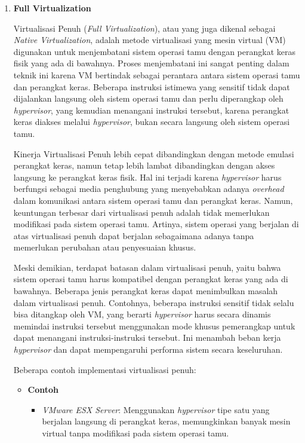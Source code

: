 \documentclass[12pt]{article}
\begin{document}
\begin{enumerate}
    \item \textbf{Full Virtualization}
    \par Virtualisasi Penuh (\textit{Full Virtualization}), atau yang juga dikenal sebagai \textit{Native Virtualization}, adalah metode virtualisasi yang mesin virtual (VM) digunakan untuk menjembatani sistem operasi tamu dengan perangkat keras fisik yang ada di bawahnya. Proses menjembatani ini sangat penting dalam teknik ini karena VM bertindak sebagai perantara antara sistem operasi tamu dan perangkat keras. Beberapa instruksi istimewa yang sensitif tidak dapat dijalankan langsung oleh sistem operasi tamu dan perlu diperangkap oleh \textit{hypervisor}, yang kemudian menangani instruksi tersebut, karena perangkat keras diakses melalui \textit{hypervisor}, bukan secara langsung oleh sistem operasi tamu.
    
    \par Kinerja Virtualisasi Penuh lebih cepat dibandingkan dengan metode emulasi perangkat keras, namun tetap lebih lambat dibandingkan dengan akses langsung ke perangkat keras fisik. Hal ini terjadi karena \textit{hypervisor} harus berfungsi sebagai media penghubung yang menyebabkan adanya \textit{overhead} dalam komunikasi antara sistem operasi tamu dan perangkat keras. Namun, keuntungan terbesar dari virtualisasi penuh adalah tidak memerlukan modifikasi pada sistem operasi tamu. Artinya, sistem operasi yang berjalan di atas virtualisasi penuh dapat berjalan sebagaimana adanya tanpa memerlukan perubahan atau penyesuaian khusus.
    
    \par Meski demikian, terdapat batasan dalam virtualisasi penuh, yaitu bahwa sistem operasi tamu harus kompatibel dengan perangkat keras yang ada di bawahnya. Beberapa jenis perangkat keras dapat menimbulkan masalah dalam virtualisasi penuh. Contohnya, beberapa instruksi sensitif tidak selalu bisa ditangkap oleh VM, yang berarti \textit{hypervisor} harus secara dinamis memindai instruksi tersebut menggunakan mode khusus pemerangkap untuk dapat menangani instruksi-instruksi tersebut. Ini menambah beban kerja \textit{hypervisor} dan dapat mempengaruhi performa sistem secara keseluruhan.
    
    \par Beberapa contoh implementasi virtualisasi penuh:
    \begin{itemize}
        \item \textbf{Contoh}
        \begin{itemize}
            \item \textit{VMware ESX Server}: Menggunakan \textit{hypervisor} tipe satu yang berjalan langsung di perangkat keras, memungkinkan banyak mesin virtual tanpa modifikasi pada sistem operasi tamu.
    

\end{itemize}
\end{itemize}
\end{enumerate}
\end{document}
